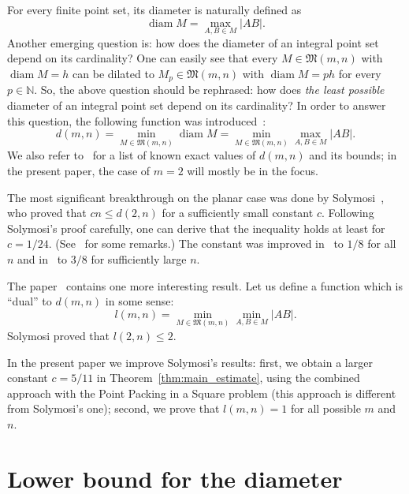 \documentclass[a4paper,14pt]{article} %
\theoremstyle{plain}
\theoremstyle{definition}
\begin{document}
For every finite point set, its diameter is naturally defined as
\begin{equation}
	\operatorname{diam} M = \max_{A,B\in M} |AB|
	.
\end{equation}
Another emerging question is: how does the diameter of an integral point set depend on its cardinality?
One can easily see that every $M\in\mathfrak{M}(m,n)$ with $\operatorname{diam} M = h$
can be dilated to $M_p\in\mathfrak{M}(m,n)$ with $\operatorname{diam} M = ph$
for every $p\in\mathbb{N}$.
So, the above question should be rephrased:
how does \textit{the least possible} diameter of an integral point set depend on its cardinality?
In order to answer this question, the following function was introduced~\cite{kurz2008bounds,kurz2008minimum}:
\begin{equation}
	d(m,n) = \min_{M\in\mathfrak{M}(m,n)} \operatorname{diam} M = \min_{M\in\mathfrak{M}(m,n)} \max_{A,B\in M} |AB|
	.
\end{equation}
We also refer to~\cite{kurz2008bounds} for a list of known exact values of $d(m,n)$
and its bounds; in the present paper, the case of $m=2$ will mostly be in the focus.

The most significant breakthrough on the planar case was done by Solymosi~\cite{solymosi2003note},
who proved that $cn \leq d(2,n)$ for a sufficiently small constant $c$.
Following Solymosi's proof carefully,
one can derive that the inequality holds at least for $c = 1/24$.
(See~\cite[Exercise 2.6]{garibaldi2005erdos} for some remarks.)
The constant was improved in~\cite{our-mz-rus} to $1/8$ for all $n$ and in~\cite{our-vmmsh-2018}
to $3/8$ for sufficiently large $n$.

The paper~\cite{solymosi2003note} contains one more interesting result.
Let us define a function which is ``dual'' to $d(m,n)$ in some sense:
\begin{equation}
	l(m,n) = \min_{M\in\mathfrak{M}(m,n)} \min_{A,B\in M} |AB|
	.
\end{equation}
Solymosi proved that $l(2,n)\leq 2$.

In the present paper we improve Solymosi's results:
first, we obtain a larger constant $c = 5/11$ in Theorem~\ref{thm:main_estimate},
using the combined approach with the Point Packing in a Square problem
(this approach is different from Solymosi's one);
second, we prove that $l(m,n)=1$ for all possible $m$ and $n$.

\section{Lower bound for the diameter}
\end{document}
